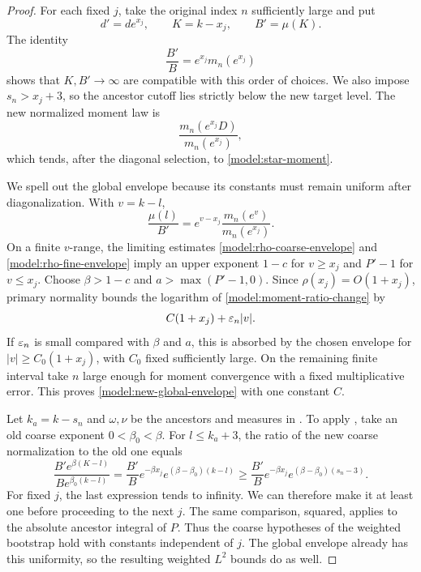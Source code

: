 \begin{proof}
For each fixed \(j\), take the original index \(n\) sufficiently
large and put
\[
 d'=d e^{x_j},\qquad K=k-x_j,\qquad B'=\mu(K).
\]
The identity
\[
 \frac{B'}B=e^{x_j}m_n(e^{x_j})
\]
shows that \(K,B'\to\infty\) are compatible with this order of
choices. We also impose \(s_n>x_j+3\), so the ancestor cutoff lies
strictly below the new target level. The new normalized moment law is
\[
 \frac{m_n(e^{x_j}D)}{m_n(e^{x_j})},
\]
which tends, after the diagonal selection, to
\eqref{model:star-moment}.

We spell out the global envelope because its constants must remain
uniform after diagonalization.  With \(v=k-l\),
\begin{equation}
\label{model:moment-ratio-change}
 \frac{\mu(l)}{B'}=
 e^{v-x_j}\frac{m_n(e^v)}{m_n(e^{x_j})}.
\end{equation}
On a finite \(v\)-range, the limiting estimates
\eqref{model:rho-coarse-envelope} and
\eqref{model:rho-fine-envelope} imply an upper exponent \(1-c\)
for \(v\ge x_j\) and \(P'-1\) for \(v\le x_j\).
Choose \(\beta>1-c\) and \(a>\max(P'-1,0)\).
Since \(\rho(x_j)=O(1+x_j)\), primary normality bounds the logarithm
of \eqref{model:moment-ratio-change} by
\[
 C(1+x_j)+\varepsilon_n|v|.
\]
If \(\varepsilon_n\) is small compared with \(\beta\) and \(a\), this is
absorbed by the chosen envelope for
\(|v|\ge C_0(1+x_j)\), with \(C_0\) fixed sufficiently large.
On the remaining finite interval take \(n\) large enough for
moment convergence with a fixed multiplicative error.  This proves
\eqref{model:new-global-envelope} with one constant \(C\).

Let \(k_a=k-s_n\) and \(\omega,\nu\) be the ancestors and measures
in .  To apply
, take an old coarse exponent
\(0<\beta_0<\beta\).  For \(l\le k_a+3\), the ratio of the new
coarse normalization to the old one equals
\begin{equation}
\label{model:ancestor-domination}
 \frac{B'e^{\beta(K-l)}}{Be^{\beta_0(k-l)}}
 =
 \frac{B'}B e^{-\beta x_j}
 e^{(\beta-\beta_0)(k-l)}
 \ge
 \frac{B'}B e^{-\beta x_j}
 e^{(\beta-\beta_0)(s_n-3)}.
\end{equation}
For fixed \(j\), the last expression tends to infinity.  We can
therefore make it at least one before proceeding to the next \(j\).
The same comparison, squared, applies to the absolute ancestor
integral of \(P\).  Thus the coarse hypotheses of the weighted
bootstrap hold with constants independent of \(j\).  The global
envelope already has this uniformity, so the resulting weighted
\(L^2\) bounds do as well.


\end{proof}
